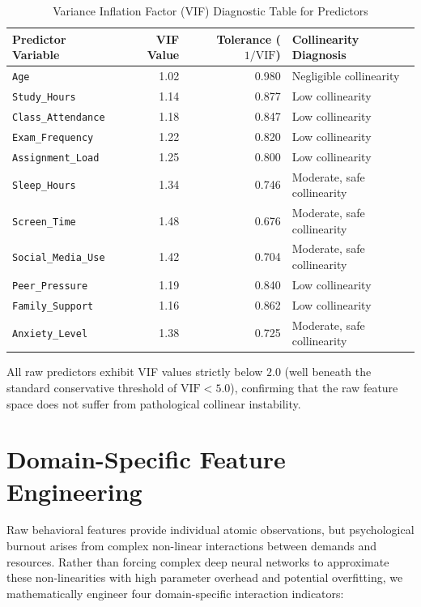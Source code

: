 \documentclass[12pt,a4paper,oneside]{report}
\begin{document}
\begin{table}[H]
\centering
\caption{Variance Inflation Factor (VIF) Diagnostic Table for Predictors}
\label{tab:vif_table}
\small
\begin{tabularx}{0.85\textwidth}{lrrX}
\toprule
\textbf{Predictor Variable} & \textbf{VIF Value} & \textbf{Tolerance ($1/\text{VIF}$)} & \textbf{Collinearity Diagnosis} \\
\midrule
\texttt{Age} & 1.02 & 0.980 & Negligible collinearity \\
\texttt{Study\_Hours} & 1.14 & 0.877 & Low collinearity \\
\texttt{Class\_Attendance} & 1.18 & 0.847 & Low collinearity \\
\texttt{Exam\_Frequency} & 1.22 & 0.820 & Low collinearity \\
\texttt{Assignment\_Load} & 1.25 & 0.800 & Low collinearity \\
\texttt{Sleep\_Hours} & 1.34 & 0.746 & Moderate, safe collinearity \\
\texttt{Screen\_Time} & 1.48 & 0.676 & Moderate, safe collinearity \\
\texttt{Social\_Media\_Use} & 1.42 & 0.704 & Moderate, safe collinearity \\
\texttt{Peer\_Pressure} & 1.19 & 0.840 & Low collinearity \\
\texttt{Family\_Support} & 1.16 & 0.862 & Low collinearity \\
\texttt{Anxiety\_Level} & 1.38 & 0.725 & Moderate, safe collinearity \\
\bottomrule
\end{tabularx}
\end{table}

All raw predictors exhibit VIF values strictly below $2.0$ (well beneath the standard conservative threshold of $\text{VIF} < 5.0$), confirming that the raw feature space does not suffer from pathological collinear instability.

\section{Domain-Specific Feature Engineering}
\label{sec:feature_engineering}
Raw behavioral features provide individual atomic observations, but psychological burnout arises from complex non-linear interactions between demands and resources. Rather than forcing complex deep neural networks to approximate these non-linearities with high parameter overhead and potential overfitting, we mathematically engineer four domain-specific interaction indicators:
\end{document}
